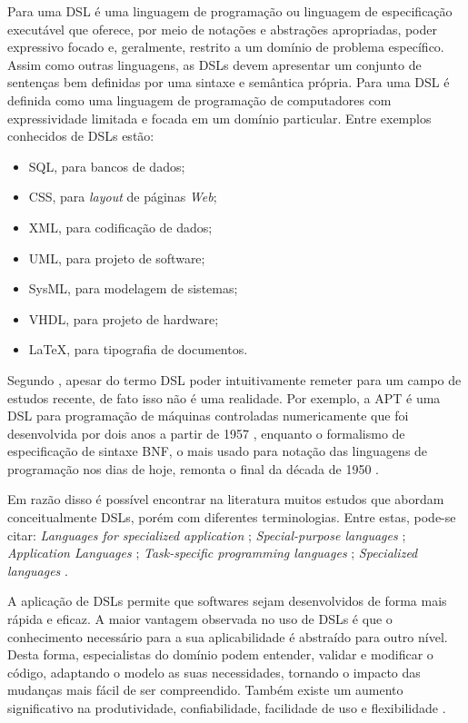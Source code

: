 Para  uma \ac{DSL} é uma linguagem de programação ou linguagem de especificação executável que oferece, por meio de notações e abstrações apropriadas, poder expressivo focado e, geralmente, restrito a um domínio de problema específico. 
Assim como outras linguagens, as \acp{DSL} devem apresentar um conjunto de sentenças bem definidas por uma sintaxe e semântica própria. 
Para  uma \ac{DSL} é definida como uma linguagem de programação de computadores com expressividade limitada e focada em um domínio particular. 
Entre exemplos conhecidos de \acp{DSL} estão: 

\begin{itemize}
    \item \ac{SQL}, para bancos de dados;
    \item \ac{CSS}, para \textit{layout} de páginas \textit{Web};
    \item \ac{XML}, para codificação de dados;
    \item \ac{UML}, para projeto de software;
    \item \ac{SysML}, para modelagem de sistemas;
    \item \ac{VHDL}, para projeto de hardware;
    \item \LaTeX, para tipografia de documentos.
\end{itemize}
    
Segundo , apesar do termo \ac{DSL} poder intuitivamente remeter para um campo de estudos recente, de fato isso não é uma realidade. 
Por exemplo, a APT é uma \ac{DSL} para programação de máquinas controladas numericamente que foi desenvolvida por dois anos a partir de 1957 \cite{Ross:1978}, enquanto o formalismo de especificação de sintaxe \ac{BNF}, o mais usado para notação das linguagens de programação nos dias de hoje, remonta o final da década de 1950 \cite{Backus:1959}.
    
Em razão disso é possível encontrar na literatura muitos estudos que abordam conceitualmente \acp{DSL}, porém com diferentes terminologias.
Entre estas, pode-se citar: \textit{Languages for specialized application} \cite{Sammet:1972}; \textit{Special-purpose languages} \cite{Wexelblat:1978};  \textit{Application Languages} \cite{Martin:1982}; \textit{Task-specific programming languages} \cite{Nardi:1993}; \textit{Specialized languages} \cite{Bergin:1996}. 
    
A aplicação de \acp{DSL} permite que softwares sejam desenvolvidos de forma mais rápida e eficaz. 
A maior vantagem observada no uso de \acp{DSL} é que o conhecimento necessário para a sua aplicabilidade é abstraído para outro nível. 
Desta forma, especialistas do domínio podem entender, validar e modificar o código, adaptando o modelo as suas necessidades, tornando o impacto das mudanças mais fácil de ser compreendido. 
Também existe um aumento significativo na produtividade, confiabilidade, facilidade de uso e flexibilidade \cite{vanDeursen:2000}.

